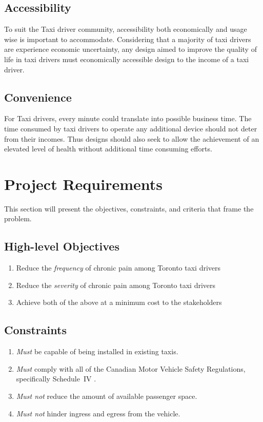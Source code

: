 \documentclass[11pt]{article}
\begin{document}
\subsection{Accessibility}
To suit the Taxi driver community, accessibility both economically and
usage wise is important to accommodate. Considering that a majority of
taxi drivers are experience economic
uncertainty\cite{facey2003health}, any design aimed to improve the
quality of life in taxi drivers must economically accessible design to
the income of a taxi driver.
 
\subsection{Convenience}
For Taxi drivers, every minute could translate into possible business
time\cite{facey2003health}. The time consumed by taxi drivers to
operate any additional device should not deter from their
incomes. Thus designs should also seek to allow the achievement of an
elevated level of health without additional time consuming efforts.
\section{Project Requirements}
\label{sec:requirements}
This section will present the objectives, constraints, and criteria 
that frame the problem.

\subsection{High-level Objectives}
\label{sec:high-level-objectives}

\begin{enumerate}
\item Reduce the \emph{frequency} of chronic pain among Toronto taxi drivers
\item Reduce the \emph{severity} of chronic pain among Toronto taxi drivers
\item Achieve both of the above at a minimum cost to the stakeholders
\end{enumerate}

\subsection{Constraints}
\begin{enumerate}
\item \emph{Must} be capable of being installed in existing taxis.
\item \emph{Must} comply with all of the Canadian Motor Vehicle Safety Regulations,
specifically Schedule~IV \cite{motorregs}.
\item \emph{Must not} reduce the amount of available passenger space.
\item \emph{Must not} hinder ingress and egress from the vehicle.
\end{enumerate}
\end{document}
